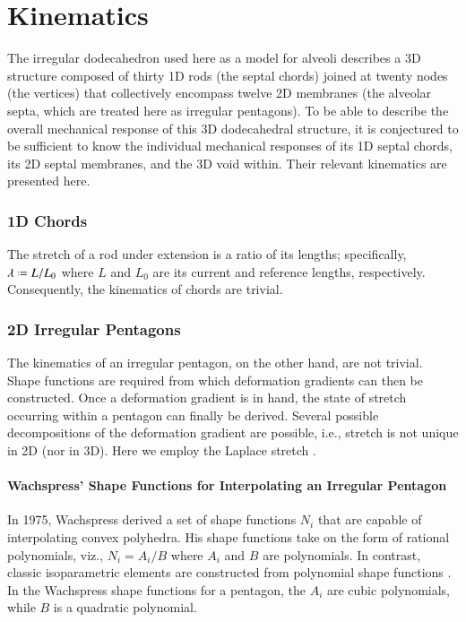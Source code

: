 \part{Kinematics}
\label{partKinematics}

The irregular dodecahedron used here as a model for alveoli describes a 3D structure composed of thirty 1D rods (the septal chords) joined at twenty nodes (the vertices) that collectively encompass twelve 2D membranes (the alveolar septa, which are treated here as irregular pentagons).  To be able to describe the overall mechanical response of this 3D dodecahedral structure, it is conjectured to be sufficient to know the individual mechanical responses of its 1D septal chords, its 2D septal membranes, and the 3D void within.  Their relevant kinematics are presented here.

\section{1D Chords}

The stretch of a rod under extension is a ratio of its lengths; specifically, $\lambda \defeq L / L_0$ where $L$ and $L_0$ are its current and reference lengths, respectively.  Consequently, the kinematics of chords are trivial.

\section{2D Irregular Pentagons}

The kinematics of an irregular pentagon, on the other hand, are not trivial.  Shape functions are required from which deformation gradients can then be constructed.  Once a deformation gradient is in hand, the state of stretch occurring within a pentagon can finally be derived.  Several possible decompositions of the deformation gradient are possible, i.e., stretch is not unique in 2D (nor in 3D).  Here we employ the Laplace stretch \cite{Freedetal19}.

\subsection{Wachspress' Shape Functions for Interpolating an Irregular Pentagon}
\label{secShapeFns}

In 1975, Wachspress \cite{Wachspress75,Wachspress16} derived a set of shape functions $N_i$ that are capable of interpolating convex polyhedra.  His shape functions take on the form of rational polynomials, viz., $N_i = A_i / B$ where $A_i$ and $B$ are polynomials.  In contrast, classic isoparametric elements are constructed from polynomial shape functions \cite{Hughes87}.  In the Wachspress shape functions for a pentagon, the $A_i$ are cubic polynomials, while $B$ is a quadratic polynomial.

